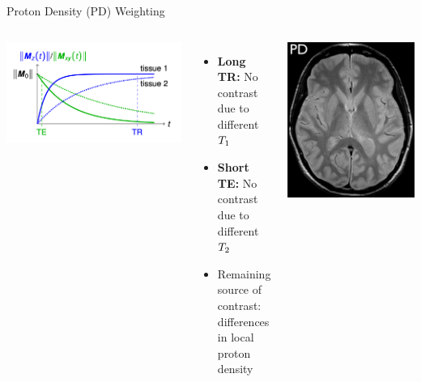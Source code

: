 \begin{frame}{Proton Density (PD) Weighting}

    \begin{columns}[t,onlytextwidth]
        \includegraphics[height=0.6\textheight]{images/weighting_pd}

        \begin{itemize}
            \item \textbf{Long TR:} No contrast due to different $T_1$
            \item \textbf{Short TE:} No contrast due to different $T_2$
            \item Remaining source of contrast: differences \\ in local proton density
        \end{itemize}

        \includegraphics[height=0.6\textheight]{images/pd}


\end{columns}
\end{frame}
